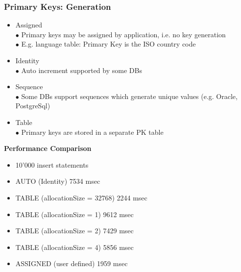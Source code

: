 \documentclass[10pt]{scrartcl}
\newcommand{\Bold}[1]{\textbf{#1}} %
\begin{document}
\subsubsection{Primary Keys: Generation}
\begin{itemize}
\item Assigned\\
$\bullet$ Primary keys may be assigned by application, i.e. no key generation\\
\hspace*{0.5cm}$\bullet$ E.g. language table: Primary Key is the ISO country code
\item Identity\\
$\bullet$ Auto increment supported by some DBs
\item Sequence\\
$\bullet$ Some DBs support sequences which generate unique values (e.g. Oracle, PostgreSql)
\item Table\\
$\bullet$ Primary keys are stored in a separate PK table
\end{itemize}
\Bold{Performance Comparison}
\begin{itemize}
\item 10'000 insert statements
\item AUTO (Identity) 7534 msec
\item TABLE (allocationSize = 32768) 2244 msec
\item TABLE (allocationSize = 1) 9612 msec
\item TABLE (allocationSize = 2) 7429 msec
\item TABLE (allocationSize = 4) 5856 msec
\item ASSIGNED (user defined) 1959 msec
\end{itemize}
\end{document}
